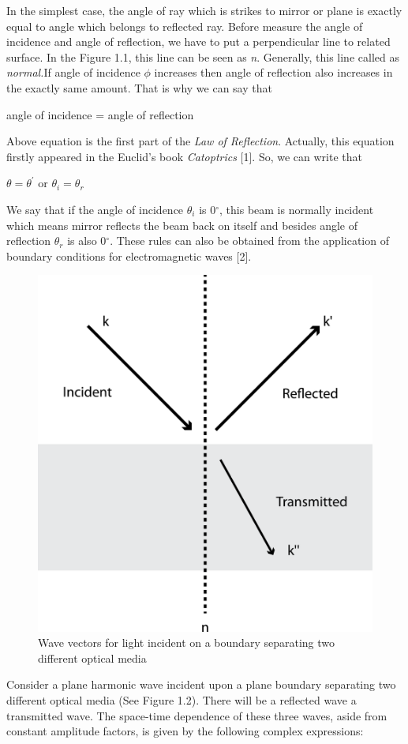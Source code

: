 \documentclass[a4paper,12pt]{report}
\begin{document}
In the simplest case, the angle of ray which is strikes to mirror or plane is exactly equal to angle which belongs to reflected ray. Before measure the angle of incidence and angle of reflection, we have to put a perpendicular line to related surface. In the Figure 1.1, this line can be seen as \textit{n}. Generally, this line called as \textit{normal.}If angle of incidence $\phi$ increases then angle of reflection also increases in the exactly same amount. That is why we can say that 
\begin{center}
	angle of incidence = angle of reflection
\end{center}
Above equation is the first part of the \textit{Law of Reflection}. Actually, this equation firstly appeared in the Euclid's book \textit{Catoptrics} [1]. So, we can write that
\begin{center}
	$\theta=\theta^{\prime}$ or $\theta_{i}=\theta_{r}$
\end{center}
We say that if the angle of incidence $\theta_{i}$ is 0$^{\circ}$, this beam is normally incident which means mirror reflects the beam back on itself and besides angle of reflection $\theta_{r}$ is also 0$^{\circ}$. These rules can also be obtained from the application of boundary conditions for electromagnetic waves [2].
\begin{figure}[h!]
\centering
\includegraphics[width=0.6\linewidth, height=0.4\textheight]{Untitled-1}
\caption{Wave vectors for light incident on a boundary separating two different optical media}
\label{fig:Untitled-1}
\end{figure}
Consider a plane harmonic wave incident upon a plane boundary separating two different optical media (See Figure 1.2). There will be a reflected wave a transmitted wave. The space-time dependence of these three waves, aside from constant amplitude factors, is given by the following complex expressions:\\\\
\end{document}
